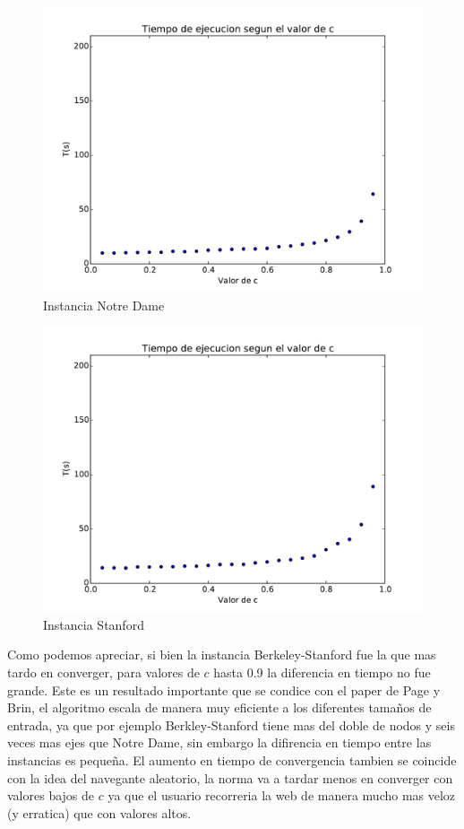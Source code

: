 \begin{figure}[h]
\centering
\includegraphics[scale=0.5]{images/web-NotreDame.pdf}
\caption{Instancia Notre Dame}
\label{timePageRank}
\end{figure}

\newpage

\begin{figure}[h]
\centering
\includegraphics[scale=0.5]{images/web-Stanford.pdf}
\caption{Instancia Stanford}
\label{timePageRank}
\end{figure}

Como podemos apreciar, si bien la instancia Berkeley-Stanford fue la que mas tardo en converger, para valores de $c$ hasta 0.9 la diferencia en tiempo no fue grande. Este es un resultado importante que se condice con el paper de Page y Brin, el algoritmo escala de manera muy eficiente a los diferentes tamaños de entrada, ya que por ejemplo Berkley-Stanford tiene mas del doble de nodos y seis veces mas ejes que Notre Dame, sin embargo la difirencia en tiempo entre las instancias es pequeña. El aumento en tiempo de convergencia tambien se coincide con la idea del navegante aleatorio, la norma va a tardar menos en converger con valores bajos de $c$ ya que el usuario recorreria la web de manera mucho mas veloz (y erratica) que con valores altos.

